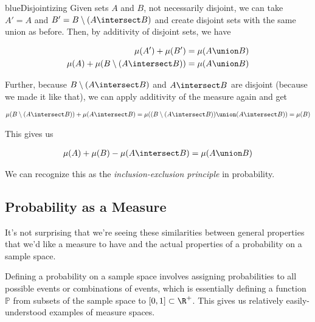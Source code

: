 \documentclass[./analysis.tex]{subfiles}
\begin{document}
    \begin{mycolorbox}{blue}{Disjointizing}
        Given sets $A$ and $B$, not necessarily disjoint, we can take $A' = A$ and $B' = B \setminus (A \intersect B)$ and create disjoint sets with the same union as before. Then, by additivity of disjoint sets, we have

        \begin{align*}
            \mu(A') + \mu(B') = \mu(A \union B)\\
            \mu(A) + \mu(B \setminus (A \intersect B)) = \mu(A \union B)
        \end{align*}

        Further, because $B \setminus (A \intersect B)$ and $A \intersect B$ are disjoint (because we made it like that), we can apply additivity of the measure again and get

        \begin{align*}
            \mu(B \setminus (A \intersect B)) + \mu(A \intersect B) = \mu((B \setminus (A \intersect B)) \union (A \intersect B)) = \mu(B) 
        \end{align*}

        This gives us 

        \begin{align*}
            \mu(A) + \mu(B) - \mu(A \intersect B) = \mu(A \union B)
        \end{align*}
    \end{mycolorbox}

    We can recognize this as the \emph{inclusion-exclusion principle} in probability.
    
    \subsection{Probability as a Measure}
    It's not surprising that we're seeing these similarities between general properties that we'd like a measure to have and the actual properties of a probability on a sample space. 
    
    Defining a probability on a sample space involves assigning probabilities to all possible events or combinations of events, which is essentially defining a function $\mathbb{P}$ from subsets of the sample space to $[0, 1] \subset \R^+$. This gives us relatively easily-understood examples of measure spaces.
    
\end{document}
